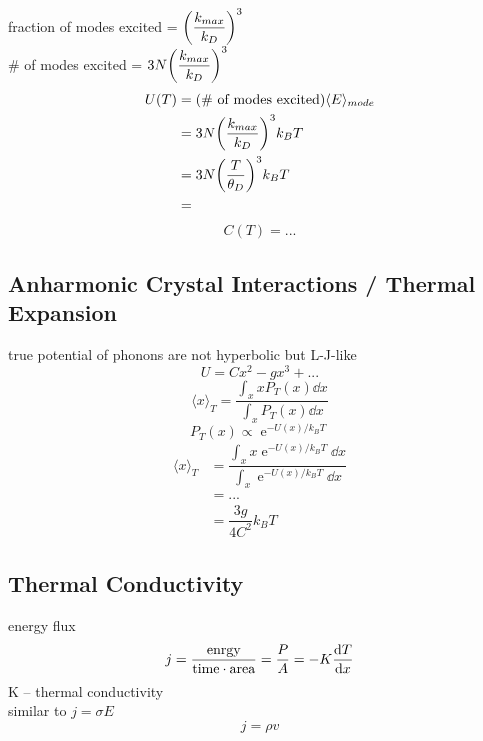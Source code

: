 \documentclass[UTF8]{ctexart} %
\DeclareMathOperator{\e}{\mathrm{e}}
\numberwithin{equation}{section}
\begin{document}
fraction of modes excited = $ \qty(\dfrac{k_{max}}{k_D})^3 $\\
\# of modes excited = $ 3N \qty(\dfrac{k_{max}}{k_D})^3 $
\begin{equation}\label{key}
\begin{aligned}
U(T) &= (\text{\# of modes excited})\langle E\rangle_{mode}\\
&= 3N\qty(\dfrac{k_{max}}{k_D})^3k_B T\\
&= 3N\qty(\dfrac{T}{\theta_D})^3k_B T\\
&= 
\end{aligned}
\end{equation}
\begin{equation}\label{key}
C(T) = ...
\end{equation}

\subsection{Anharmonic Crystal Interactions / Thermal Expansion}
true potential of phonons are not hyperbolic but L-J-like\\
\begin{equation}\label{key}
U = Cx^2 - gx^3 + ...
\end{equation}
\begin{equation}\label{key}
\langle x\rangle_T = \dfrac{\int_x x P_T(x)\dd x}{\int_x P_T(x)\dd x}
\end{equation}
\begin{equation}\label{key}
P_T(x) \propto \e^{-U(x)/k_B T}
\end{equation}
\begin{equation}\label{key}
\begin{aligned}
\langle x\rangle_T &= \dfrac{\int_x x \e^{-U(x)/k_B T}\dd x}{\int_x \e^{-U(x)/k_B T}\dd x}\\
&= ...\\
&= \dfrac{3g}{4C^2}k_B T
\end{aligned}
\end{equation}

\subsection{Thermal Conductivity}
energy flux
\begin{equation}\label{key}
j = \dfrac{\text{enrgy}}{\text{time}\cdot\text{area}} = \dfrac{P}{A} = -K\dv{T}{x}
\end{equation}
K -- thermal conductivity\\
similar to $ j = \sigma E $\\
\begin{equation}\label{key}
j = \rho v
\end{equation}
\end{document}
